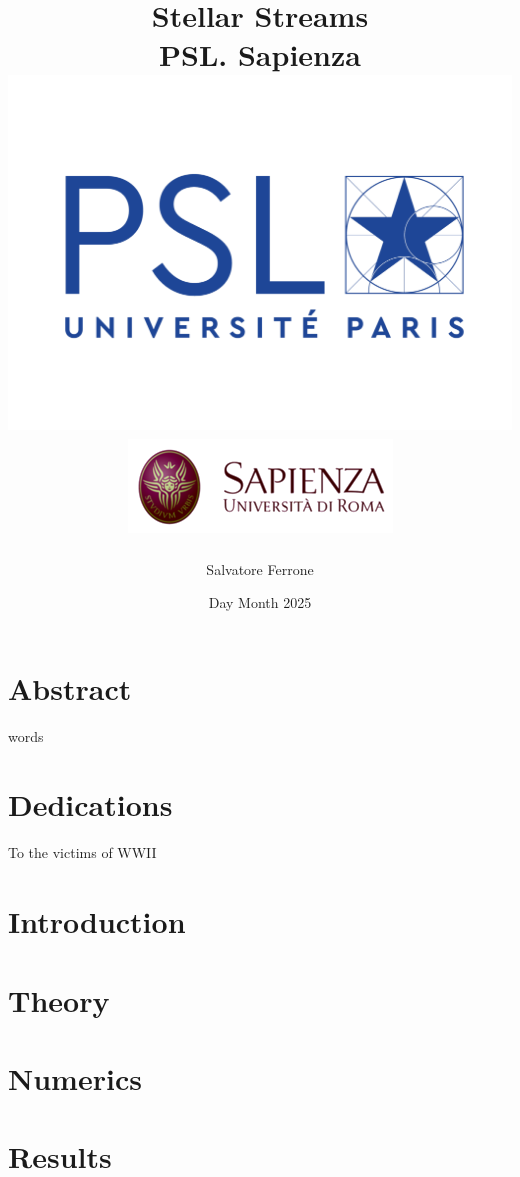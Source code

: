 \documentclass[12pt]{report}
\title{
{Stellar Streams}\\
{\large PSL. Sapienza}\\
{\includegraphics[width=0.5\linewidth]{LOGO-PSL-nov-2017.png}}
{\includegraphics[width=0.6\linewidth]{Uniroma1.png}}
}
\author{Salvatore Ferrone}
\date{Day Month 2025}
\begin{document}
\maketitle

\chapter*{Abstract}
words

\chapter*{Dedications}
To the victims of WWII

\tableofcontents

\chapter{Introduction}


\chapter{Theory}


\chapter{Numerics}


\chapter{Results}





\end{document}
